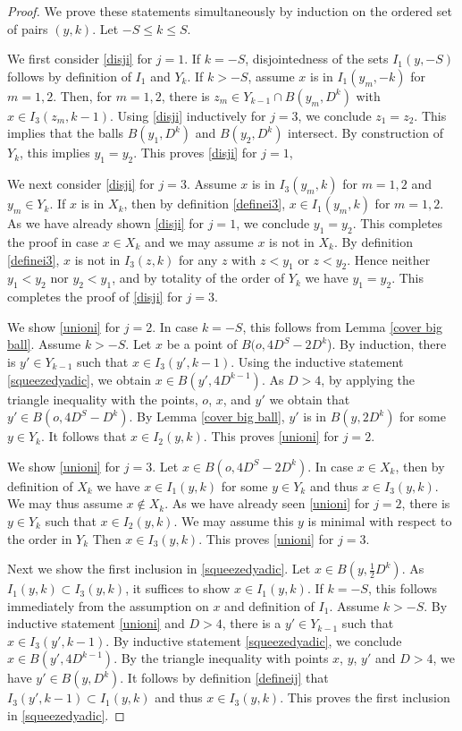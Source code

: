 \begin{proof}
We prove these statements simultaneously by induction on the ordered set of pairs $(y,k)$.
Let $-S\le k\le S$.

We first consider \eqref{disji} for $j=1$.
If $k=-S$, disjointedness of the sets $I_1(y,-S)$ follows by definition of $I_1$ and $Y_k$. If $k>-S$,
assume $x$ is in $I_1(y_m,-k)$ for $m=1,2$.
Then, for $m=1,2$, there is $z_m\in Y_{k-1}\cap B(y_m,D^k)$ with $x\in I_3(z_m,k-1)$.
Using \eqref{disji} inductively for $j=3$, we
conclude $z_1=z_2$. This implies that the balls
$B(y_1, D^k)$ and $B(y_2, D^k)$ intersect. By construction of $Y_k$, this implies $y_1=y_2$.
This proves \eqref{disji} for $j=1$,

We next consider \eqref{disji} for $j=3$.
Assume $x$ is in $I_3(y_m,k)$ for $m=1,2$ and $y_m\in Y_k$. If $x$ is in $X_k$, then by definition
\eqref{definei3}, $x\in I_1(y_m,k)$ for $m=1,2$.
As we have already shown \eqref{disji} for $j=1$,
we conclude $y_1=y_2$. This completes the proof in
case $x\in X_k$ and we may assume $x$ is not in $X_k$. By definition \eqref{definei3}, $x$ is not
in $I_3(z,k)$  for any $z$ with $z<y_1$ or $z<y_2$.
Hence neither $y_1<y_2$ nor $y_2<y_1$, and by totality
of the order of $Y_k$ we have $y_1=y_2$. This completes the proof of \eqref{disji} for $j=3$.

We  show \eqref{unioni}  for $j=2$.
In case $k=-S$, this follows from Lemma \ref{cover big ball}.
Assume  $k>-S$. Let $x$ be a point of $B(o, 4D^S-2D^k$).
By induction, there is $y'\in Y_{k-1}$ such that
$x\in I_3(y',k-1)$. Using the inductive statement
\eqref{squeezedyadic}, we obtain $x\in B(y',4D^{k-1})$.
As $D>4$, by applying the triangle inequality with
the points, $o$, $x$, and $y'$ we obtain that  $y'\in B(o, 4D^S-D^k)$.
By Lemma {\ref{cover big ball}}, $y'$ is in $B(y,2D^k)$
for some $y\in Y_k$. It follows that  $x\in I_2(y,k)$.
This proves \eqref{unioni}  for $j=2$.

We  show \eqref{unioni} for $j=3$.
Let $x\in  B(o, 4D^S-2D^k)$. In case $x\in X_k$,
 then by definition of $X_k$ we have $x\in I_1(y,k)$ for some $y\in Y_k$ and thus $x\in I_3(y,k)$. We may thus assume $x\not\in X_k$. As we have already seen
\eqref{unioni} for $j=2$,
 there is $y\in Y_k$ such that $x\in I_2(y,k)$.
We may assume this $y$ is minimal with respect to the order in $Y_k$
Then $x\in I_3(y,k)$.
 This proves \eqref{unioni}  for $j=3$.

Next we  show the first inclusion in \eqref{squeezedyadic}.
Let $x\in B(y,\frac 1{2}D^k)$.
As $I_1(y,k)\subset I_3(y,k)$,
it suffices to show $x\in I_1(y,k)$.
If $k=-S$, this follows immediately from
the assumption on $x$ and definition of $I_1$.
Assume $k>-S$. By inductive statement \eqref{unioni}
and $D>4$, there is a
$y'\in Y_{k-1}$ such that $x\in I_3(y',k-1)$.
By inductive statement \eqref{squeezedyadic},
we conclude $x\in B(y',4D^{k-1})$.
By the triangle inequality with points $x$, $y$, $y'$ and $D>4$, we have
$y'\in B(y,D^k)$. It follows by definition
\eqref{defineij} that
$I_3(y',k-1)\subset I_1(y,k)$ and thus
{$x\in I_3(y,k)$}. This proves the first inclusion
in \eqref{squeezedyadic}.



\end{proof}
